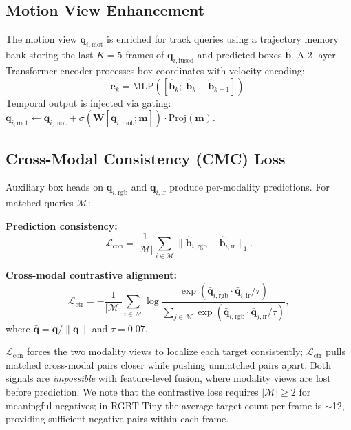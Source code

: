 \documentclass[10pt,twocolumn,letterpaper]{article}
\begin{document}
\subsection{Motion View Enhancement}

The motion view $\mathbf{q}_{i,\text{mot}}$ is enriched for track queries using a trajectory memory bank storing the last $K=5$ frames of $\mathbf{q}_{i,\text{fused}}$ and predicted boxes $\hat{\mathbf{b}}$.
A 2-layer Transformer encoder processes box coordinates with velocity encoding:
\begin{equation}
\mathbf{e}_k = \text{MLP}([\hat{\mathbf{b}}_k;\;\hat{\mathbf{b}}_k - \hat{\mathbf{b}}_{k-1}]).
\end{equation}
Temporal output is injected via gating: $\mathbf{q}_{i,\text{mot}} \leftarrow \mathbf{q}_{i,\text{mot}} + \sigma(\mathbf{W}[\mathbf{q}_{i,\text{mot}};\mathbf{m}]) \cdot \text{Proj}(\mathbf{m})$.

\subsection{Cross-Modal Consistency (CMC) Loss}
\label{sec:cmc}

Auxiliary box heads on $\mathbf{q}_{i,\text{rgb}}$ and $\mathbf{q}_{i,\text{ir}}$ produce per-modality predictions.
For matched queries $\mathcal{M}$:

\textbf{Prediction consistency:}
\begin{equation}
\mathcal{L}_\text{con} = \frac{1}{|\mathcal{M}|}\sum_{i \in \mathcal{M}} \|\hat{\mathbf{b}}_{i,\text{rgb}} - \hat{\mathbf{b}}_{i,\text{ir}}\|_1.
\end{equation}

\textbf{Cross-modal contrastive alignment:}
\begin{equation}
\mathcal{L}_\text{ctr} = -\frac{1}{|\mathcal{M}|}\sum_{i \in \mathcal{M}} \log \frac{\exp(\bar{\mathbf{q}}_{i,\text{rgb}} \cdot \bar{\mathbf{q}}_{i,\text{ir}} / \tau)}{\sum_{j \in \mathcal{M}} \exp(\bar{\mathbf{q}}_{i,\text{rgb}} \cdot \bar{\mathbf{q}}_{j,\text{ir}} / \tau)},
\end{equation}
where $\bar{\mathbf{q}}=\mathbf{q}/\|\mathbf{q}\|$ and $\tau=0.07$.

$\mathcal{L}_\text{con}$ forces the two modality views to localize each target consistently; $\mathcal{L}_\text{ctr}$ pulls matched cross-modal pairs closer while pushing unmatched pairs apart.
Both signals are \textit{impossible} with feature-level fusion, where modality views are lost before prediction.
We note that the contrastive loss requires $|\mathcal{M}|\!\geq\!2$ for meaningful negatives; in RGBT-Tiny the average target count per frame is ${\sim}$12, providing sufficient negative pairs within each frame.
\end{document}
